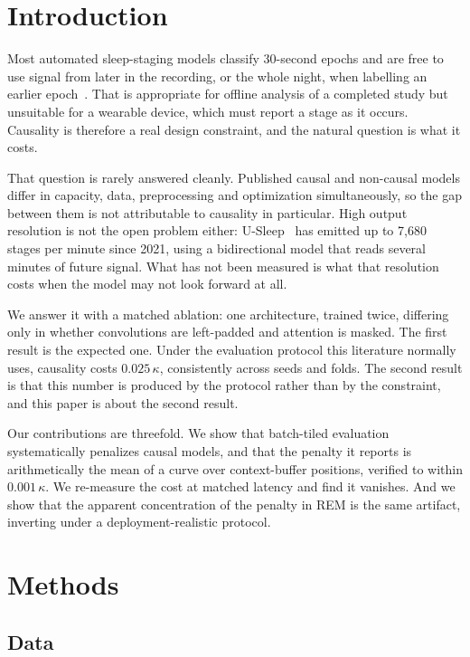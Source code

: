 \documentclass[conference]{IEEEtran}
\begin{document}
\section{Introduction}

Most automated sleep-staging models classify 30-second epochs and are free to use signal from
later in the recording, or the whole night, when labelling an earlier epoch~\cite{deepsleepnet,
attnsleep}. That is appropriate for offline analysis of a completed study but unsuitable for a
wearable device, which must report a stage as it occurs. Causality is therefore a real design
constraint, and the natural question is what it costs.

That question is rarely answered cleanly. Published causal and non-causal models differ in
capacity, data, preprocessing and optimization simultaneously, so the gap between them is not
attributable to causality in particular. High output resolution is not the open problem either:
U-Sleep~\cite{usleep} has emitted up to 7{,}680 stages per minute since 2021, using a
bidirectional model that reads several minutes of future signal. What has not been measured is
what that resolution costs when the model may not look forward at all.

We answer it with a matched ablation: one architecture, trained twice, differing only in whether
convolutions are left-padded and attention is masked. The first result is the expected one. Under
the evaluation protocol this literature normally uses, causality costs $0.025\,\kappa$,
consistently across seeds and folds. The second result is that this number is produced by the
protocol rather than by the constraint, and this paper is about the second result.

Our contributions are threefold. We show that batch-tiled evaluation systematically penalizes
causal models, and that the penalty it reports is arithmetically the mean of a curve over
context-buffer positions, verified to within $0.001\,\kappa$. We re-measure the cost at matched
latency and find it vanishes. And we show that the apparent concentration of the penalty in REM
is the same artifact, inverting under a deployment-realistic protocol.

\section{Methods}

\subsection{Data}
\end{document}
